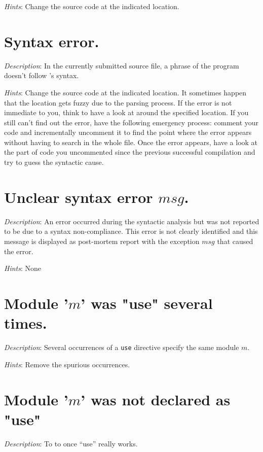 {\em Hints}: Change the source code at the indicated location.



\section*{Syntax error.}
{\em Description}: In the currently submitted source file, a phrase of
the program doesn't follow \focal's syntax.

{\em Hints}: Change the source code at the indicated location. It
sometimes happen that the location gets fuzzy due to the parsing
process. If the error is not immediate to you, think to have a look at
around the specified location. If you still can't find out the error,
have the following emergency process: comment your code and
incrementally uncomment it to find the point where the error appears
without having to search in the whole file. Once the error appears,
have a look at the part of code you uncommented since the previous
successful compilation and try to guess the syntactic cause.



\section*{Unclear syntax error $msg$.}
{\em Description}: An error occurred during the syntactic analysis but
was not reported to be due to a syntax non-compliance. This error is
not clearly identified and this message is displayed as post-mortem
report with the exception $msg$ that caused the error.

{\em Hints}: None



\section*{Module '$m$' was "use" several times.}
{\em Description}: Several occurrences of a {\tt use} directive
specify the same module $m$.

{\em Hints}: Remove the spurious occurrences.



\section*{Module '$m$' was not declared as "use"}
{\em Description}: {\color{red}To to once ``use'' really works.}

